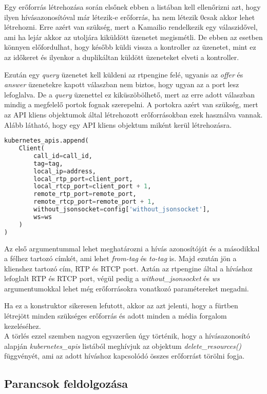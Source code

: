 Egy erőforrás létrehozása során elsőnek ebben a listában kell ellenőrizni azt, hogy
ilyen hívásazonosítóval már létezik-e erőforrás, ha nem létezik 0csak akkor lehet létrehozni. 
Erre azért van szükség, mert a Kamailio rendelkezik egy válaszidővel, ami ha lejár
akkor az utoljára kiküldött üzenetet megismétli. De ebben az esetben könnyen előfordulhat,
hogy később küldi vissza a kontroller az üzenetet, mint ez az időkeret és ilyenkor 
a duplikáltan küldött üzeneteket elveti a kontroller.

Ezután egy \textit{query} üzenetet kell küldeni az rtpengine felé, ugyanis az 
\textit{offer} és \textit{answer} üzenetekre kapott válaszban nem biztos, hogy ugyan
az a port lesz lefoglalva. De a \textit{query} üzenettel ez kiküszöbölhető, mert az 
erre adott válaszban mindig a megfelelő portok fognak szerepelni. A portokra azért van
szükség, mert az API kliens objektumok által létrehozott erőforrásokban ezek használva
vannak. Alább látható, hogy egy API kliens objektum miként kerül létrehozásra.

\begin{lstlisting}[language=python, caption=Kubernetes API kliens objektum létrehozása, label=lst:kubeAPI]
kubernetes_apis.append(
	Client(
		call_id=call_id,
		tag=tag,
		local_ip=address,
		local_rtp_port=client_port,
		local_rtcp_port=client_port + 1,
		remote_rtp_port=remote_port,
		remote_rtcp_port=remote_port + 1,
		without_jsonsocket=config['without_jsonsocket'],
		ws=ws
	)
)
\end{lstlisting}

Az első argumentummal lehet meghatározni a hívás azonosítóját és a másodikkal a félhez
tartozó címkét, ami lehet \textit{from-tag} és \textit{to-tag} is. Majd ezután jön a
klienshez tartozó cím, RTP és RTCP port. Aztán az rtpengine által a híváshoz lefoglalt
RTP és RTCP port, végül pedig a \textit{without\_jsonsocket} és \textit{ws} argumentumokkal
lehet még erőforrásokra vonatkozó paramétereket megadni.

Ha ez a konstruktor sikeresen lefutott, akkor az azt jelenti, hogy a fürtben létrejött
minden szükséges erőforrás és adott minden a média forgalom kezeléséhez. \\

A törlés ezzel szemben nagyon egyszerűen úgy történik, hogy a hívásazonosító alapján
\textit{kubernetes\_apis} listából meghívjuk az objektum \textit{delete\_resources()}
függvényét, ami az adott híváshoz kapcsolódó összes erőforrást törölni fogja.

\subsection{Parancsok feldolgozása}

